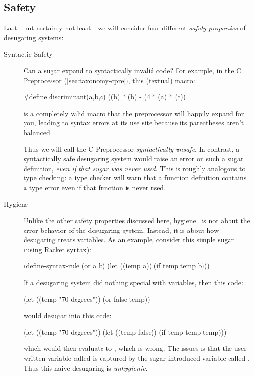 \subsection{Safety}\label{sec:taxonomy-safety}

Last---but certainly not least---we will consider four different
\emph{safety properties} of desugaring systems:
\begin{description}
  \item[Syntactic Safety] Can a sugar expand to syntactically invalid
    code? For example, in the C Preprocessor (\cref{sec:taxonomy-cpre}), this
    (textual) macro:
\begin{CorrectlyIndentedCodes}
#define discriminant(a,b,c) ((b) * (b) - (4 * (a) * (c))
\end{CorrectlyIndentedCodes}
    is a completely valid macro that the preprocessor will happily
    expand for you, leading to syntax errors at its use site because
    its parentheses aren't balanced.

    Thus we will call the C Preprocessor \emph{syntactically unsafe}.
    In contrast, a syntactically safe desugaring system would raise an
    error on such a sugar definition, \emph{even if that sugar was
      never used}. This is roughly analogous to type checking: a type checker
    will warn that a function definition contains a type error even
    if that function is never used.
  \item[Hygiene] Unlike the other safety properties discussed here,
    hygiene~\cite{hygienic-macros} is not about the error behavior of the desugaring
    system.  Instead, it is about how desugaring treats variables. As
    an example, consider this simple  sugar (using Racket
    syntax):
\begin{CorrectlyIndentedCodes}
(define-syntax-rule
  (or a b)
  (let ((temp a)) (if temp temp b)))
\end{CorrectlyIndentedCodes}
    If a desugaring system did nothing special with variables, then
    this code:
\begin{CorrectlyIndentedCodes}
(let ((temp "70 degrees"))
  (or false temp))
\end{CorrectlyIndentedCodes}
    would desugar into this code:
\begin{CorrectlyIndentedCodes}
(let ((temp "70 degrees"))
  (let ((temp false)) (if temp temp temp)))
\end{CorrectlyIndentedCodes}
    which would then evaluate to , which is wrong. The
    issues is that the user-written variable called  is
    captured by the sugar-introduced variable called .
    Thus this naive desugaring is \emph{unhygienic}.
    

\end{description}
